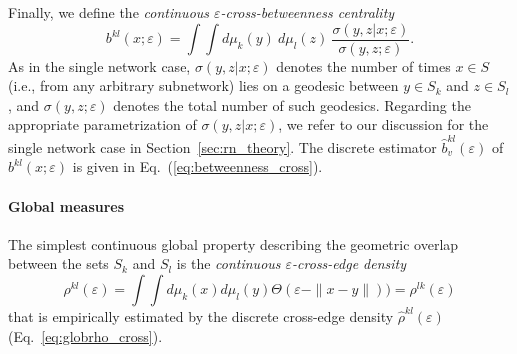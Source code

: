Finally, we define the \textit{continuous $\varepsilon$-cross-betweenness centrality}
\begin{equation}
b^{kl}(x;\varepsilon)=\int \int d\mu_k(y)\ d\mu_l(z)\ \frac{\sigma(y,z|x;\varepsilon)}{\sigma(y,z;\varepsilon)}.
\end{equation}
\noindent
As in the single network case, $\sigma(y,z|x;\varepsilon)$ denotes the number of times $x\in S$ (i.e., from any arbitrary subnetwork) lies on a geodesic between $y\in S_k$ and $z\in S_l$, and $\sigma(y,z;\varepsilon)$ denotes the total number of such geodesics. Regarding the appropriate parametrization of $\sigma(y,z|x;\varepsilon)$, we refer to our discussion for the single network case in Section~\ref{sec:rn_theory}. The discrete estimator $\hat{b}_v^{kl}(\varepsilon)$ of $b^{kl}(x;\varepsilon)$ is given in Eq.~(\ref{eq:betweenness_cross}).


\paragraph{Global measures}

The simplest continuous global property describing the geometric overlap between the sets $S_k$ and $S_l$ is the \textit{continuous $\varepsilon$-cross-edge density}
\begin{equation}
\rho^{kl}(\varepsilon) = \int\!\!\!\int d\mu_k(x) d\mu_l(y) \Theta(\varepsilon - \|x - y\|)) = \rho^{lk}(\varepsilon)
\end{equation}
that is empirically estimated by the discrete cross-edge density $\hat{\rho}^{kl}(\varepsilon)$ (Eq.~\ref{eq:globrho_cross}).

